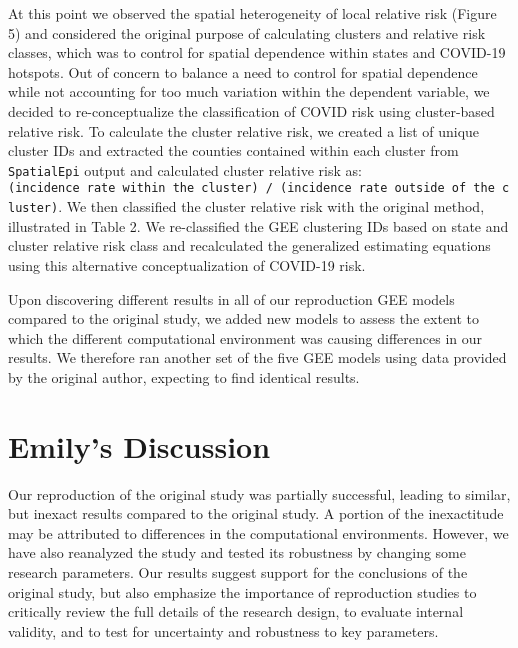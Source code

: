 \documentclass[
]{article}
\begin{document}
At this point we observed the spatial heterogeneity of local relative
risk (Figure 5) and considered the original purpose of calculating
clusters and relative risk classes, which was to control for spatial
dependence within states and COVID-19 hotspots. Out of concern to
balance a need to control for spatial dependence while not accounting
for too much variation within the dependent variable, we decided to
re-conceptualize the classification of COVID risk using cluster-based
relative risk. To calculate the cluster relative risk, we created a list
of unique cluster IDs and extracted the counties contained within each
cluster from \texttt{SpatialEpi} output and calculated cluster relative
risk as:
\texttt{(incidence\ rate\ within\ the\ cluster)\ /\ (incidence\ rate\ outside\ of\ the\ cluster)}.
We then classified the cluster relative risk with the original method,
illustrated in Table 2. We re-classified the GEE clustering IDs based on
state and cluster relative risk class and recalculated the generalized
estimating equations using this alternative conceptualization of
COVID-19 risk.

Upon discovering different results in all of our reproduction GEE models
compared to the original study, we added new models to assess the extent
to which the different computational environment was causing differences
in our results. We therefore ran another set of the five GEE models
using data provided by the original author, expecting to find identical
results.

\hypertarget{emilys-discussion}{%
\section{Emily's Discussion}\label{emilys-discussion}}

Our reproduction of the original study was partially successful, leading
to similar, but inexact results compared to the original study. A
portion of the inexactitude may be attributed to differences in the
computational environments. However, we have also reanalyzed the study
and tested its robustness by changing some research parameters. Our
results suggest support for the conclusions of the original study, but
also emphasize the importance of reproduction studies to critically
review the full details of the research design, to evaluate internal
validity, and to test for uncertainty and robustness to key parameters.
\end{document}
